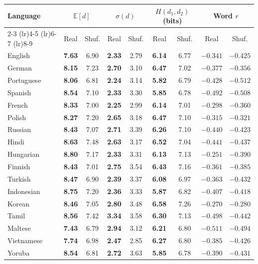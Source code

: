 \documentclass{interact}
\begin{document}
\begin{table}[htbp]
{\begin{tabular}{lcccccccc}
\toprule
Language & \multicolumn{2}{c}{$\mathbb{E}[d]$} & \multicolumn{2}{c}{$\sigma(d)$} & \multicolumn{2}{c}{$H(d_1, d_2)$ (bits)} & \multicolumn{2}{c}{Word $r$} \\
\cmidrule(lr){2-3} \cmidrule(lr){4-5} \cmidrule(lr){6-7} \cmidrule(lr){8-9}
 & Real & Shuf. & Real & Shuf. & Real & Shuf. & Real & Shuf. \\
\midrule
English    & \textbf{7.63} & 6.90 & \textbf{2.33} & 2.79 & \textbf{6.14} & 6.77 & $-0.341$ & $-0.425$ \\
German     & \textbf{8.15} & 7.23 & \textbf{2.70} & 3.10 & \textbf{6.47} & 7.02 & $-0.377$ & $-0.356$ \\
Portuguese & \textbf{8.06} & 6.81 & \textbf{2.24} & 3.14 & \textbf{5.82} & 6.79 & $-0.428$ & $-0.512$ \\
Spanish    & \textbf{8.54} & 7.10 & \textbf{2.33} & 3.30 & \textbf{5.85} & 6.78 & $-0.492$ & $-0.508$ \\
French     & \textbf{8.33} & 7.00 & \textbf{2.25} & 2.99 & \textbf{6.14} & 7.01 & $-0.298$ & $-0.360$ \\
Polish     & \textbf{8.27} & 7.20 & \textbf{2.65} & 3.18 & \textbf{6.47} & 7.10 & $-0.315$ & $-0.321$ \\
Russian    & \textbf{8.43} & 7.07 & \textbf{2.71} & 3.39 & \textbf{6.26} & 7.10 & $-0.440$ & $-0.423$ \\
Hindi      & \textbf{8.63} & 7.48 & \textbf{2.63} & 3.17 & \textbf{6.52} & 7.04 & $-0.441$ & $-0.437$ \\
Hungarian  & \textbf{8.80} & 7.17 & \textbf{2.33} & 3.31 & \textbf{6.13} & 7.13 & $-0.251$ & $-0.390$ \\
Finnish    & \textbf{8.43} & 7.01 & \textbf{2.75} & 3.54 & \textbf{6.43} & 7.16 & $-0.361$ & $-0.385$ \\
Turkish    & \textbf{8.47} & 6.90 & \textbf{2.39} & 3.37 & \textbf{6.08} & 6.97 & $-0.363$ & $-0.432$ \\
Indonesian & \textbf{8.75} & 7.20 & \textbf{2.36} & 3.33 & \textbf{5.87} & 6.82 & $-0.407$ & $-0.418$ \\
Korean     & \textbf{8.46} & 7.05 & \textbf{2.80} & 3.48 & \textbf{6.58} & 7.26 & $-0.270$ & $-0.280$ \\
Tamil      & \textbf{8.56} & 7.42 & \textbf{3.34} & 3.58 & \textbf{6.30} & 7.13 & $-0.498$ & $-0.442$ \\
Maltese    & \textbf{7.43} & 6.79 & \textbf{2.94} & 3.12 & \textbf{6.21} & 6.80 & $-0.511$ & $-0.494$ \\
Vietnamese & \textbf{7.74} & 6.98 & \textbf{2.47} & 2.85 & \textbf{6.27} & 6.80 & $-0.385$ & $-0.426$ \\
Yoruba     & \textbf{8.54} & 6.81 & \textbf{2.72} & 3.63 & \textbf{5.85} & 6.78 & $-0.390$ & $-0.431$ \\
\bottomrule
\end{tabular}}
\label{tab:comparison}
\end{table}
\end{document}
